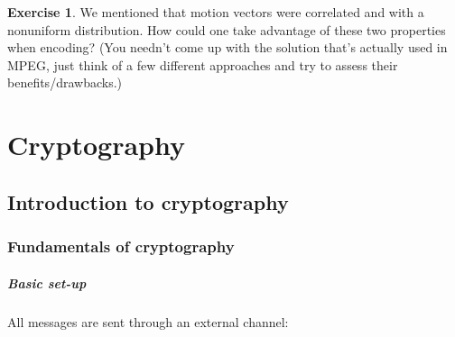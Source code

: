 \documentclass[a4paper, 11pt, openany]{book}
\numberwithin{equation}{section}
\theoremstyle{plain}
\theoremstyle{definition}
\newtheorem{exercise}   {Exercise}  [section]
\newcommand{\Important}[1]{\textcolor{red}{#1}}
\newcommand{\Structure}[1]{\textcolor{blue}{#1}}
\begin{document}
\begin{exercise}
We mentioned that motion vectors were correlated and with a nonuniform distribution. How could one take advantage of these two properties when encoding? (You needn't come up with the solution that's actually used in MPEG, just think of a few different approaches and try to assess their benefits/drawbacks.)
\end{exercise}


\chapter{Cryptography}




\section{Introduction to cryptography}
\label{sec:11}


\subsection{Fundamentals of cryptography}

\paragraph{Basic set-up}

All messages are sent through an external channel:

\begin{center}
\end{center}
\end{document}
